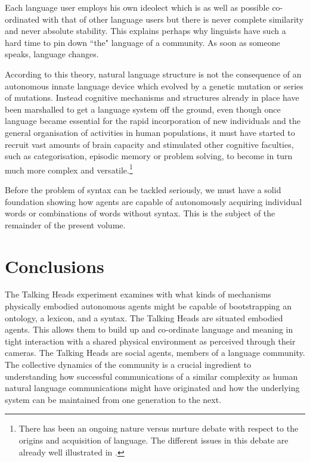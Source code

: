 Each language user employs his own ideolect which is 
as well as possible co-ordinated with that of other
language users but there is never complete similarity 
and never absolute stability.  
This explains perhaps why linguists have such a hard
time to pin down ``the" language of a community. As soon 
as someone speaks, language changes. 

According to this theory, natural language structure is
not the consequence of an 
autonomous innate language device which evolved 
by a genetic mutation or series of mutations. Instead 
cognitive mechanisms and structures already in place have been 
marshalled to get a language system off the ground, even though 
once language became essential for the rapid incorporation
of new individuals and the general organisation of 
activities in human populations, it must have started
to recruit vast amounts of brain capacity and stimulated 
other cognitive faculties, such as categorisation,
episodic memory or problem solving, to become in turn 
much more complex and versatile.\footnote{
There has been an ongoing nature versus nurture debate 
with respect to the origins and acquisition of language. 
The different issues in this debate are already well
illustrated in \cite{Piattelli:1980}.} 

Before the problem of syntax can 
be tackled seriously, we must have a solid foundation showing 
how agents are capable of autonomously acquiring individual words
or combinations of words without syntax. This is the subject of the
remainder of the present volume.

\section{Conclusions}

The Talking Heads experiment examines with what kinds
of mechanisms physically embodied autonomous agents 
might be capable of bootstrapping an ontology, a lexicon, 
and a syntax. The Talking Heads are situated embodied
agents. This 
allows them to build up and co-ordinate language and meaning 
in tight interaction with a shared physical environment
as perceived through their cameras. 
The Talking Heads are social agents, members of a
language community. The collective
dynamics of the community is a crucial ingredient to understanding
how successful communications of a similar complexity as
human natural language communications might have 
originated and how the underlying system can 
be maintained from one generation to the next. 


